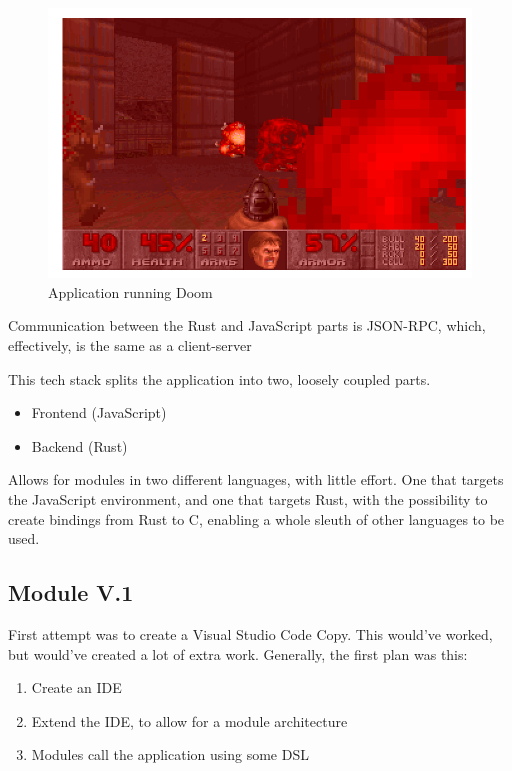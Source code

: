 \begin{figure}
  \centering
  \includegraphics[scale=0.5]{./pics/doom}
  \caption{Application running Doom}
  \label{fig:doom}
\end{figure}

Communication between the Rust and JavaScript parts is JSON-RPC, which,
effectively, is the same as a client-server

This tech stack splits the application into two, loosely coupled parts.
\begin{itemize}
  \item Frontend (JavaScript)
  \item Backend (Rust)
\end{itemize}

Allows for modules in two different languages, with little effort. One that
targets the JavaScript environment, and one that targets Rust, with the
possibility to create bindings from Rust to C, enabling a whole sleuth of other
languages to be used.



\subsection{Module V.1}

First attempt was to create a Visual Studio Code Copy. This would've worked, but
would've created a lot of extra work.
Generally, the first plan was this:
\begin{enumerate}
  \item Create an IDE
  \item Extend the IDE, to allow for a module architecture
  \item Modules call the application using some DSL
\end{enumerate}

